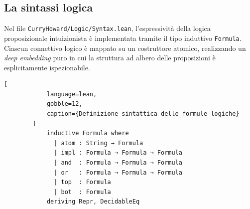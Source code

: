 \subsection{La sintassi logica}
Nel file \texttt{CurryHoward/Logic/Syntax.lean}, l'espressività della logica proposizionale intuizionista è implementata tramite il tipo induttivo \texttt{Formula}. Ciascun 
connettivo logico è mappato su un costruttore atomico, realizzando un \emph{deep embedding} puro in cui la struttura ad albero delle proposizioni è esplicitamente ispezionabile.
\begin{center}
    \begin{minipage}{\textwidth}
        \begin{lstlisting}[
            language=lean, 
            gobble=12,
            caption={Definizione sintattica delle formule logiche}
        ]
            inductive Formula where
              | atom : String → Formula
              | impl : Formula → Formula → Formula
              | and  : Formula → Formula → Formula
              | or   : Formula → Formula → Formula
              | top  : Formula
              | bot  : Formula
            deriving Repr, DecidableEq
        \end{lstlisting}
    \end{minipage}
\end{center}

